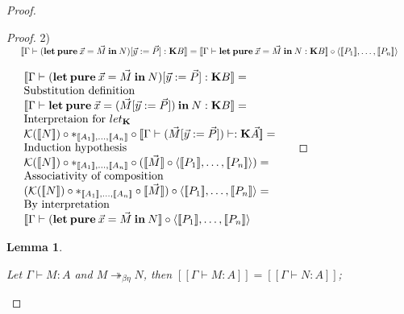 \documentclass[a4paper]{article}
\newtheorem{lemma}{Lemma}
\begin{document}
\begin{proof}
\begin{proof}
\vspace{\baselineskip}

2) $\begin{array}{lll}&[\![\Gamma \vdash ({\bf let \: pure} \: \vec{x} = \vec{M} {\: \bf in \:} N) [\vec{y} := \vec{P}] : {\bf K} B]\!]
=[\![\Gamma \vdash {\bf let \: pure} \: \vec{x} = \vec{M} {\: \bf in \:} N : {\bf K}B]\!] \circ \langle [\![P_1]\!],\dots,[\![P_n]\!]\rangle& \end{array}$

\vspace{\baselineskip}

$\begin{array}{lll}
&[\![\Gamma \vdash ({\bf let \: pure} \: \vec{x} = \vec{M} {\: \bf in \:} N) [\vec{y} := \vec{P}] : {\bf K} B]\!] =& \\
&\text{Substitution definition}& \\
&[\![\Gamma \vdash {\bf let \: pure} \: \vec{x} = (\vec{M} [\vec{y} := \vec{P}]) {\: \bf in \:} N : {\bf K}B]\!] =& \\
&\text{Interpretaion for $let_{\bf K}$}& \\
&\mathcal{K}([\![N]\!]) \circ \ast_{[\![A_1]\!],\dots,[\![A_n]\!]} \circ [\![\Gamma \vdash (\vec{M} [\vec{y} := \vec{P}]) \vdash : {\bf K}\vec{A}]\!] =& \\
&\text{Induction hypothesis}& \\
&\mathcal{K}([\![N]\!]) \circ \ast_{[\![A_1]\!],\dots,[\![A_n]\!]} \circ ([\![\vec{M}]\!] \circ \langle [\![P_1]\!],\dots,[\![P_n]\!]\rangle) = & \\
&\text{Associativity of composition}& \\
&(\mathcal{K}([\![N]\!]) \circ \ast_{[\![A_1]\!],\dots,[\![A_n]\!]} \circ [\![\vec{M}]\!]) \circ \langle [\![P_1]\!],\dots,[\![P_n]\!]\rangle = & \\
&\text{By interpretation}&\\
&[\![\Gamma \vdash ({\bf let \: pure} \: \vec{x} = \vec{M} {\: \bf in \:} N]\!] \circ \langle [\![P_1]\!],\dots,[\![P_n]\!]\rangle&
\end{array}$

\end{proof}

\begin{lemma}
  $ $

  Let $\Gamma \vdash M : A$ and $M \twoheadrightarrow_{\beta \eta} N$, then $[\![\Gamma \vdash M : A]\!] = [\![\Gamma \vdash N : A]\!]$;
\end{lemma}


\end{proof}
\end{document}
